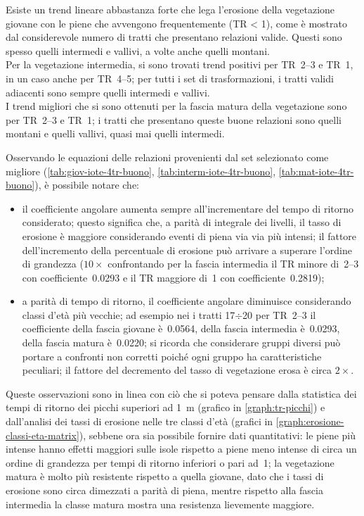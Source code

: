 Esiste un trend lineare abbastanza forte che lega l'erosione della vegetazione giovane con le piene che avvengono frequentemente (TR \SI{< 1}{\anno}), come è mostrato dal considerevole numero di tratti che presentano relazioni valide.
Questi sono spesso quelli intermedi e vallivi, a volte anche quelli montani.
\\
Per la vegetazione intermedia, si sono trovati trend positivi per TR~\SIrange[range-phrase = {-}, range-units = single]{2}{3}{\mesi} e TR~\SI{1}{\anno}, in un caso anche per TR~\SIrange[range-phrase = {-}, range-units = single]{4}{5}{\mesi}; per tutti i set di trasformazioni, i tratti validi adiacenti sono sempre quelli intermedi e vallivi.
\\
I trend migliori che si sono ottenuti per la fascia matura della vegetazione sono per TR~\SIrange[range-phrase = {-}, range-units = single]{2}{3}{\mesi} e TR~\SI{1}{\anno}; i tratti che presentano queste buone relazioni sono quelli montani e quelli vallivi, quasi mai quelli intermedi.

Osservando le equazioni delle relazioni provenienti dal set selezionato come migliore (\cref{tab:giov-iote-4tr-buono}, \cref{tab:interm-iote-4tr-buono}, \cref{tab:mat-iote-4tr-buono}), è possibile notare che:
%
\begin{itemize}
	\item il coefficiente angolare aumenta sempre all'incrementare del tempo di ritorno considerato;
	questo significa che, a parità di integrale dei livelli, il tasso di erosione è maggiore considerando eventi di piena via via più intensi;
	il fattore dell'incremento della percentuale di erosione può arrivare a superare l'ordine di grandezza ($10\times$ confrontando per la fascia intermedia il TR minore di~\SIrange[range-phrase = {-}, range-units = single]{2}{3}{\mesi} con coefficiente~\num{0.0293} e il TR maggiore di~\SI{1}{\anno} con coefficiente~\num{0.2819});
	\item a parità di tempo di ritorno, il coefficiente angolare diminuisce considerando classi d'età più vecchie; ad esempio nei i tratti 17$\div$20 per TR~\SIrange[range-phrase = {-}, range-units = single]{2}{3}{\mesi} il coefficiente della fascia giovane è~\num{0.0564}, della fascia intermedia è~\num{0.0293}, della fascia matura è~\num{0.0220};
	si ricorda che considerare gruppi diversi può portare a confronti non corretti poiché ogni gruppo ha caratteristiche peculiari;
	il fattore del decremento del tasso di vegetazione erosa è circa $2 \times$.
\end{itemize}
%
Queste osservazioni sono in linea con ciò che si poteva pensare dalla statistica dei tempi di ritorno dei picchi superiori ad \SI{1}{\m} (grafico in \cref{graph:tr-picchi}) e dall'analisi dei tassi di erosione nelle tre classi d'età (grafici in \cref{graph:erosione-classi-eta-matrix}), sebbene ora sia possibile fornire dati quantitativi:
le piene più intense hanno effetti maggiori sulle isole rispetto a piene meno intense di circa un ordine di grandezza per tempi di ritorno inferiori o pari ad~\SI{1}{\anno};
la vegetazione matura è molto più resistente rispetto a quella giovane, dato che i tassi di erosione sono circa dimezzati a parità di piena, mentre rispetto alla fascia intermedia la classe matura mostra una resistenza lievemente maggiore.

